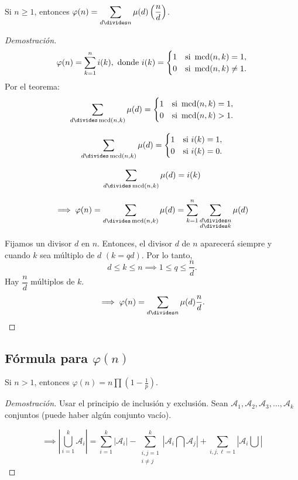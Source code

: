 \begin{theorem}
	Si $n\geq1$, entonces $\displaystyle\varphi(n)=\sum_{d\divides n}\mu(d)\left(\frac{n}{d}\right)$.
	\begin{proof}[Demostración]
		\[\varphi(n)=\sum_{k=1}^{n}i(k), \text{ donde } i(k)=\begin{cases}
		1 & \text{si } \operatorname{mcd}(n,k)=1,\\
		0 & \text{si } \operatorname{mcd}(n,k)\neq1.
		\end{cases}\]
		Por el teorema:
		\[\sum_{d\divides\mcd(n,k)}\mu(d)=\begin{cases}
		1 & \text{si }\mcd(n,k)=1,\\
		0 & \text{si } \mcd(n,k)>1.
		\end{cases}\]
		
		\[\sum_{d\divides\mcd(n,k)}\mu(d)=\begin{cases}
		1 & \text{si } i(k)=1,\\
		0 & \text{si } i(k)=0.
		\end{cases}\]
		
		\[\sum_{d\divides\mcd(n,k)}\mu(d)=i(k)\]
		
		\[\implies\varphi(n)=\sum_{d\divides\mcd(n,k)}\mu(d)=\sum_{k=1}^{n}\sum_{\substack{d\divides n\\
		d\divides k}}\mu(d)\]
	
		Fijamos un divisor $d$ en $n$. Entonces, el divisor $d$ de $n$ aparecerá siempre y cuando $k$ sea múltiplo de $d$ $(k=qd)$. Por lo tanto,
		\[d\leq k\leq n\implies 1\leq q\leq\frac{n}{d}.\]
		Hay $\dfrac{n}{d}$ múltiplos de $k$.
		\[\implies\varphi(n)=\sum_{d\divides n}\mu(d)\frac{n}{d}.\]
	\end{proof}
\end{theorem}

\subsection{Fórmula para $\varphi(n)$}

\begin{theorem}
Si $n>1$, entonces $\displaystyle\varphi(n)=n\prod\left(1-\frac{1}{p}\right)$.
\begin{proof}[Demostración]
Usar el principio de inclusión y exclusión. Sean $\mathcal{A}_1,\mathcal{A}_2,\mathcal{A}_3,\ldots,\mathcal{A}_k$ conjuntos (puede haber algún conjunto vacío).

\[\displaystyle\implies\left|\bigcup^{k}_{i=1}\mathcal{A}_{i}\right|=\sum_{i=1}^{k}\left|\mathcal{A}_i\right|-\sum_{\substack{i,j=1\\i\neq j}}^{k}\left|\mathcal{A}_{i}\bigcap\mathcal{A}_{j}\right|+\sum_{i,j,\ell=1}\left|\mathcal{A}_i\bigcup\right| \]
	\end{proof}
\end{theorem}